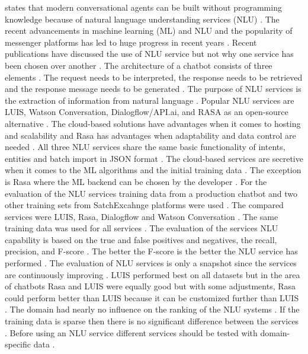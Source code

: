 \citet{braunEvaluatingNLU} states that modern conversational agents can be built without programming knowledge because of natural language understanding services (NLU) \cite{braunEvaluatingNLU}. The recent advancements in machine learning (ML) and NLU and the popularity of messenger platforms has led to huge progress in recent years \cite{braunEvaluatingNLU}. Recent publications have discussed the use of NLU service but not why one service has been chosen over another \cite{braunEvaluatingNLU}. The architecture of a chatbot consists of three elements \cite{braunEvaluatingNLU}. The request needs to be interpreted, the response needs to be retrieved and the response message needs to be generated \cite{braunEvaluatingNLU}. The purpose of NLU services is the extraction of information from natural language \cite{braunEvaluatingNLU}. Popular NLU services are LUIS, Watson Conversation, Dialogflow/API.ai, and RASA as an open-source alternative \cite{braunEvaluatingNLU}. The cloud-based solutions have advantages when it comes to hosting and scalability and Rasa has advantages when adaptability and data control are needed \cite{braunEvaluatingNLU}. All three NLU services share the same basic functionality of intents, entities and batch import in JSON format \cite{braunEvaluatingNLU}. The cloud-based services are secretive when it comes to the ML algorithms and the initial training data \cite{braunEvaluatingNLU}. The exception is Rasa where the ML backend can be chosen by the developer \cite{braunEvaluatingNLU}. For the evaluation of the NLU services training data from a production chatbot and two other training sets from SatchExcahnge platforms were used \cite{braunEvaluatingNLU}. The compared services were LUIS, Rasa, Dialogflow and Watson Conversation \cite{braunEvaluatingNLU}. The same training data was used for all services \cite{braunEvaluatingNLU}. The evaluation of the services NLU capability is based on the true and false positives and negatives, the recall, precision, and F-score \cite{braunEvaluatingNLU}. The better the F-score is the better the NLU service has performed \cite{braunEvaluatingNLU}. The evaluation of NLU services is only a snapshot since the services are continuously improving \cite{braunEvaluatingNLU}. LUIS performed best on all datasets but in the area of chatbots Rasa and LUIS were equally good but with some adjustments, Rasa could perform better than LUIS because it can be customized further than LUIS \cite{braunEvaluatingNLU}. The domain had nearly no influence on the ranking of the NLU systems \cite{braunEvaluatingNLU}.
If the training data is sparse then there is no significant difference between the services \cite{braunEvaluatingNLU}. Before using an NLU service different services should be tested with domain-specific data \cite{braunEvaluatingNLU}.

